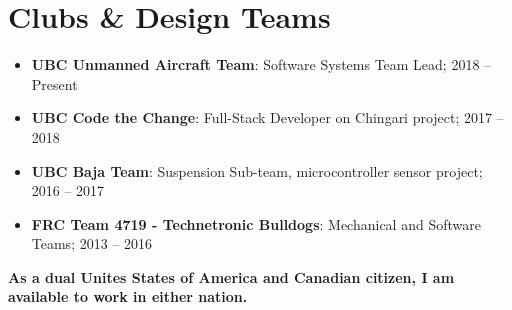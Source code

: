 \documentclass[letterpaper,11pt]{article}
\newcommand{\resumeItem}[2]{
  \item\small{
    \textbf{#1}{#2 \vspace{-2pt}}
  }
}
\newcommand{\resumeSubItem}[2]{\resumeItem{#1}{: #2}\vspace{-4pt}}
\newcommand{\resumeSubHeadingListStart}{\begin{itemize}[leftmargin=*]}
\newcommand{\resumeSubHeadingListEnd}{\end{itemize}}
\begin{document}
\section{Clubs \& Design Teams}
  \resumeSubHeadingListStart
    \resumeSubItem{UBC Unmanned Aircraft Team}
      {Software Systems Team Lead; 2018 -- Present}
    \resumeSubItem{UBC Code the Change}
      {Full-Stack Developer on Chingari project; 2017 -- 2018}
    \resumeSubItem{UBC Baja Team}
      {Suspension Sub-team, microcontroller sensor project; 2016 -- 2017}
    \resumeSubItem{FRC Team 4719 - Technetronic Bulldogs}
      {Mechanical and Software Teams; 2013 -- 2016}
  \resumeSubHeadingListEnd

\vspace{5mm}
\textbf{As a dual Unites States of America and Canadian citizen, I am available to work in either nation.}
\end{document}
